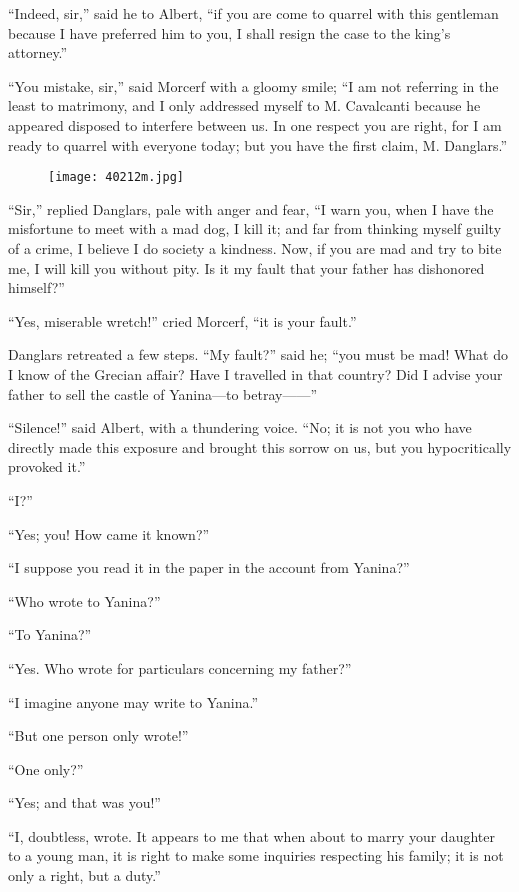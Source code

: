 “Indeed, sir,” said he to Albert, “if you are come to quarrel with this
gentleman because I have preferred him to you, I shall resign the case
to the king’s attorney.”

“You mistake, sir,” said Morcerf with a gloomy smile; “I am not
referring in the least to matrimony, and I only addressed myself to M.
Cavalcanti because he appeared disposed to interfere between us. In one
respect you are right, for I am ready to quarrel with everyone today;
but you have the first claim, M. Danglars.”

\begin{figure}[ht]
\texttt{[image: 40212m.jpg]}
\end{figure}

“Sir,” replied Danglars, pale with anger and fear, “I warn you, when I
have the misfortune to meet with a mad dog, I kill it; and far from
thinking myself guilty of a crime, I believe I do society a kindness.
Now, if you are mad and try to bite me, I will kill you without pity.
Is it my fault that your father has dishonored himself?”

“Yes, miserable wretch!” cried Morcerf, “it is your fault.”

Danglars retreated a few steps. “My fault?” said he; “you must be mad!
What do I know of the Grecian affair? Have I travelled in that country?
Did I advise your father to sell the castle of Yanina—to betray——”

“Silence!” said Albert, with a thundering voice. “No; it is not you who
have directly made this exposure and brought this sorrow on us, but you
hypocritically provoked it.”

“I?”

“Yes; you! How came it known?”

“I suppose you read it in the paper in the account from Yanina?”

“Who wrote to Yanina?”

“To Yanina?”

“Yes. Who wrote for particulars concerning my father?”

“I imagine anyone may write to Yanina.”

“But one person only wrote!”

“One only?”

“Yes; and that was you!”

“I, doubtless, wrote. It appears to me that when about to marry your
daughter to a young man, it is right to make some inquiries respecting
his family; it is not only a right, but a duty.”

